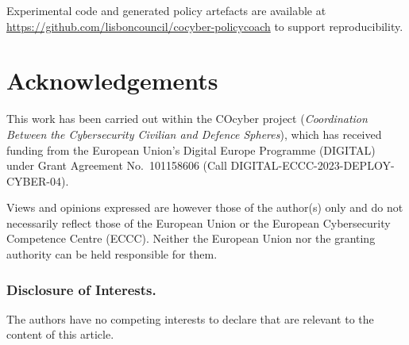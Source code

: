\documentclass[runningheads]{llncs}
\begin{document}
Experimental code and generated policy artefacts are available at
\url{https://github.com/lisboncouncil/cocyber-policycoach} to support
reproducibility.

\section*{Acknowledgements}

This work has been carried out within the COcyber project
(\textit{Coordination Between the Cybersecurity Civilian and Defence Spheres}),
which has received funding from the European Union's Digital Europe
Programme (DIGITAL) under Grant Agreement No.~101158606 (Call
DIGITAL-ECCC-2023-DEPLOY-CYBER-04).

Views and opinions expressed are however those of the author(s) only and
do not necessarily reflect those of the European Union or the European
Cybersecurity Competence Centre (ECCC). Neither the European Union nor
the granting authority can be held responsible for them.

\subsubsection*{Disclosure of Interests.}
The authors have no competing interests to declare that are relevant to
the content of this article.



\end{document}

